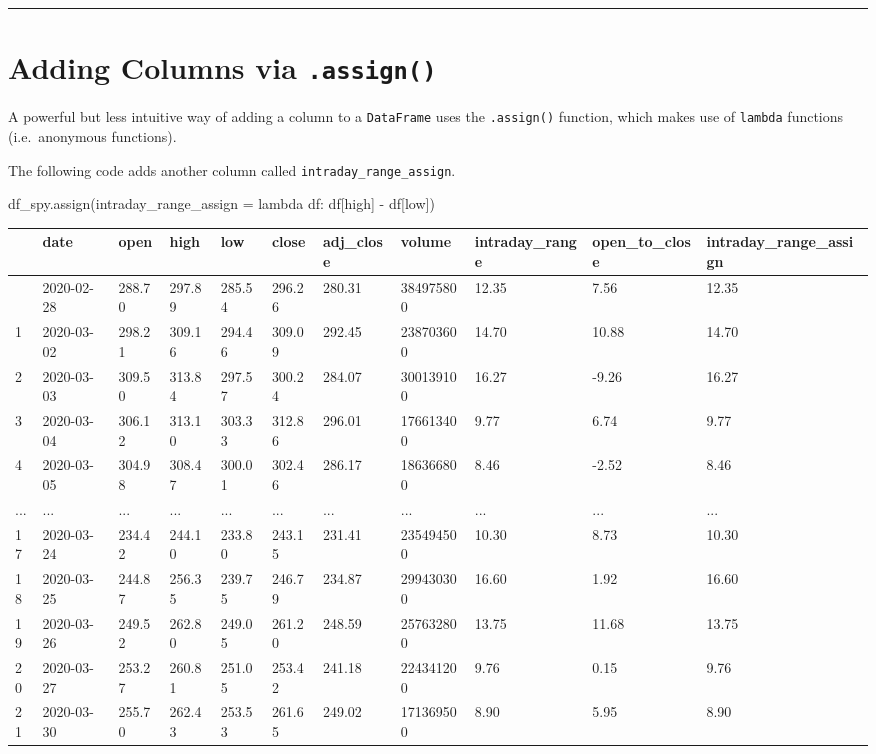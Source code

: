 \documentclass[
  letterpaper,
  DIV=11,
  numbers=noendperiod]{scrreprt}
\newenvironment{Shaded}{\begin{snugshade}}{\end{snugshade}}
\newcommand{\KeywordTok}[1]{\textcolor[rgb]{0.00,0.23,0.31}{#1}}
\newcommand{\NormalTok}[1]{\textcolor[rgb]{0.00,0.23,0.31}{#1}}
\newcommand{\OperatorTok}[1]{\textcolor[rgb]{0.37,0.37,0.37}{#1}}
\newcommand{\StringTok}[1]{\textcolor[rgb]{0.13,0.47,0.30}{#1}}
\begin{document}
\begin{center}\rule{0.5\linewidth}{0.5pt}\end{center}

\hypertarget{adding-columns-via-.assign}{%
\section{\texorpdfstring{Adding Columns via
\texttt{.assign()}}{Adding Columns via .assign()}}\label{adding-columns-via-.assign}}

A powerful but less intuitive way of adding a column to a
\texttt{DataFrame} uses the \texttt{.assign()} function, which makes use
of \texttt{lambda} functions (i.e.~anonymous functions).

The following code adds another column called
\texttt{intraday\_range\_assign}.

\begin{Shaded}
\begin{Highlighting}[]
\NormalTok{df\_spy.assign(intraday\_range\_assign }\OperatorTok{=} \KeywordTok{lambda}\NormalTok{ df: df[}\StringTok{\textquotesingle{}high\textquotesingle{}}\NormalTok{] }\OperatorTok{{-}}\NormalTok{ df[}\StringTok{\textquotesingle{}low\textquotesingle{}}\NormalTok{])}
\end{Highlighting}
\end{Shaded}

\begin{longtable}[]{@{}lllllllllll@{}}
\toprule\noalign{}
& date & open & high & low & close & adj\_close & volume &
intraday\_range & open\_to\_close & intraday\_range\_assign \\
\midrule\noalign{}
\endhead
\bottomrule\noalign{}
\endlastfoot
0 & 2020-02-28 & 288.70 & 297.89 & 285.54 & 296.26 & 280.31 & 384975800
& 12.35 & 7.56 & 12.35 \\
1 & 2020-03-02 & 298.21 & 309.16 & 294.46 & 309.09 & 292.45 & 238703600
& 14.70 & 10.88 & 14.70 \\
2 & 2020-03-03 & 309.50 & 313.84 & 297.57 & 300.24 & 284.07 & 300139100
& 16.27 & -9.26 & 16.27 \\
3 & 2020-03-04 & 306.12 & 313.10 & 303.33 & 312.86 & 296.01 & 176613400
& 9.77 & 6.74 & 9.77 \\
4 & 2020-03-05 & 304.98 & 308.47 & 300.01 & 302.46 & 286.17 & 186366800
& 8.46 & -2.52 & 8.46 \\
... & ... & ... & ... & ... & ... & ... & ... & ... & ... & ... \\
17 & 2020-03-24 & 234.42 & 244.10 & 233.80 & 243.15 & 231.41 & 235494500
& 10.30 & 8.73 & 10.30 \\
18 & 2020-03-25 & 244.87 & 256.35 & 239.75 & 246.79 & 234.87 & 299430300
& 16.60 & 1.92 & 16.60 \\
19 & 2020-03-26 & 249.52 & 262.80 & 249.05 & 261.20 & 248.59 & 257632800
& 13.75 & 11.68 & 13.75 \\
20 & 2020-03-27 & 253.27 & 260.81 & 251.05 & 253.42 & 241.18 & 224341200
& 9.76 & 0.15 & 9.76 \\
21 & 2020-03-30 & 255.70 & 262.43 & 253.53 & 261.65 & 249.02 & 171369500
& 8.90 & 5.95 & 8.90 \\
\end{longtable}
\end{document}

